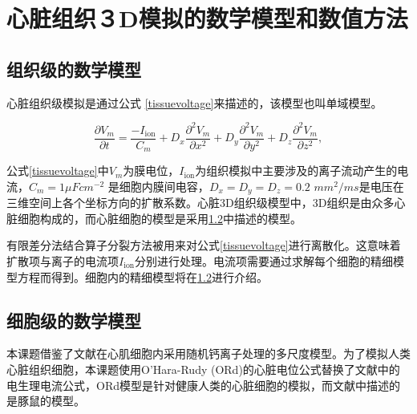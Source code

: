 

\section{心脏组织３D模拟的数学模型和数值方法}

\subsection{组织级的数学模型}
心脏组织级模拟是通过公式 \ref{tissuevoltage}来描述的，该模型也叫单域模型。

\begin{equation}
\frac{\partial V_{m}}{\partial t}=\frac{-I_\mathrm{ion}}{C_{m}} + D_{x}\frac{\partial^{2}V_{m}}{\partial x^{2}}+D_{y}\frac{\partial^{2}V_{m}}{\partial  y^{2}}+D_{z}\frac{\partial^{2}V_{m}}{\partial z^{2}},
\label{tissuevoltage}
\end{equation}

公式\ref{tissuevoltage}中$V_{m}$为膜电位，$I_\mathrm{ion}$为组织模拟中主要涉及的离子流动产生的电流，$C_{m}=1\mu F cm^{-2}$ 是细胞内膜间电容，$D_{x}=D_y=D_z=0.2 $ $mm^{2}/ms$是电压在三维空间上各个坐标方向的扩散系数。心脏3D组织级模型中，3D组织是由众多心脏细胞构成的，而心脏细胞的模型是采用\ref{cellmodel}中描述的模型。

有限差分法结合算子分裂方法被用来对公式\ref{tissuevoltage}进行离散化。这意味着扩散项与离子的电流项$I_\mathrm{ion}$分别进行处理。电流项需要通过求解每个细胞的精细模型方程而得到。细胞内的精细模型将在\ref{cellmodel}进行介绍。

\subsection{细胞级的数学模型}
\label{cellmodel}

 本课题借鉴了文献在心肌细胞内采用随机钙离子处理的多尺度模型。为了模拟人类心脏组织细胞，本课题使用O'Hara-Rudy (ORd)的心脏电位公式替换了文献中的电生理电流公式，ORd模型是针对健康人类的心脏细胞的模拟，而文献中描述的是豚鼠的模型。
 
